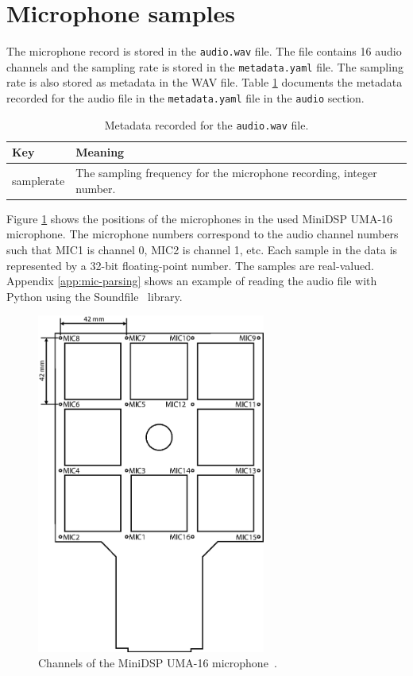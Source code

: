 \section{Microphone samples}
\label{sec:audio-file}
The microphone record is stored in the \texttt{audio.wav} file. 
The file contains 16 audio channels and the sampling rate is stored in the \texttt{metadata.yaml} file.
The sampling rate is also stored as metadata in the WAV file.
Table \ref{tab:mic-metadata} documents the metadata recorded for the audio file in the \texttt{metadata.yaml} file in the \texttt{audio} section.

\begin{table}[H]
    \centering
    \begin{tabular}{l l}
        \toprule
        \textbf{Key} & \textbf{Meaning} \\
        \midrule
        samplerate & The sampling frequency for the microphone recording, integer number. \\
        \bottomrule
    \end{tabular}
    \caption{Metadata recorded for the \texttt{audio.wav} file.}
    \label{tab:mic-metadata}
\end{table}

Figure \ref{fig:mic-channels} shows the positions of the microphones in the used MiniDSP UMA-16 microphone.
The microphone numbers correspond to the audio channel numbers such that MIC1 is channel 0, MIC2 is channel 1, etc.
Each sample in the data is represented by a 32-bit floating-point number.
The samples are real-valued.
Appendix \ref{app:mic-parsing} shows an example of reading the audio file with Python using the Soundfile~\cite{python-soundfile} library.

\begin{figure}
    \centering
    \includegraphics[width=0.67\textwidth]{fig/4/microphone-channels.eps}
    \caption{Channels of the MiniDSP UMA-16 microphone~\cite{minidsp-spec}.}
    \label{fig:mic-channels}
\end{figure}


